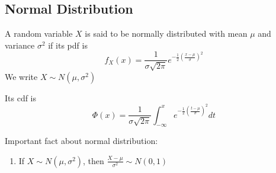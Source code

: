 \subsection{Normal Distribution}
\begin{definition}
	A random variable $X$ is said to be normally distributed with mean $\mu$ and variance $\sigma^2$ if its pdf is 
	\begin{equation}
		f_X(x) = \frac{1}{\sigma\sqrt{2\pi}}e^{-\frac{1}{2}(\frac{x-\mu}{\sigma})^2}
	\end{equation}
	We write $X\sim N(\mu, \sigma^2)$

	Its cdf is 
	\begin{equation}
		\Phi(x) = \frac{1}{\sigma\sqrt{2\pi}}\int^x_{-\infty}e^{-\frac{1}{2}(\frac{t-\mu}{\sigma})^2}dt 
	\end{equation}
\end{definition}

Important fact about normal distribution:

\begin{enumerate}
	\item If $X\sim N(\mu, \sigma^2)$, then $	\frac{X-\mu}{\sigma^2}\sim N(0,1)$
\end{enumerate}


